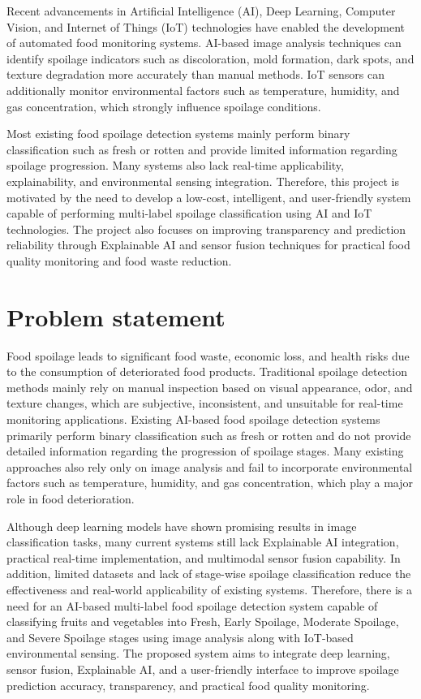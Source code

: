 Recent advancements in Artificial Intelligence (AI), Deep Learning, Computer Vision, and Internet of Things (IoT) technologies have enabled the development of automated food monitoring systems. AI-based image analysis techniques can identify spoilage indicators such as discoloration, mold formation, dark spots, and texture degradation more accurately than manual methods. IoT sensors can additionally monitor environmental factors such as temperature, humidity, and gas concentration, which strongly influence spoilage conditions.

Most existing food spoilage detection systems mainly perform binary classification such as fresh or rotten and provide limited information regarding spoilage progression. Many systems also lack real-time applicability, explainability, and environmental sensing integration. Therefore, this project is motivated by the need to develop a low-cost, intelligent, and user-friendly system capable of performing multi-label spoilage classification using AI and IoT technologies. The project also focuses on improving transparency and prediction reliability through Explainable AI and sensor fusion techniques for practical food quality monitoring and food waste reduction.

\section[Problem statement]{\textbf{Problem statement}}
Food spoilage leads to significant food waste, economic loss, and health risks due to the consumption of deteriorated food products. Traditional spoilage detection methods mainly rely on manual inspection based on visual appearance, odor, and texture changes, which are subjective, inconsistent, and unsuitable for real-time monitoring applications. Existing AI-based food spoilage detection systems primarily perform binary classification such as fresh or rotten and do not provide detailed information regarding the progression of spoilage stages. Many existing approaches also rely only on image analysis and fail to incorporate environmental factors such as temperature, humidity, and gas concentration, which play a major role in food deterioration.

Although deep learning models have shown promising results in image classification tasks, many current systems still lack Explainable AI integration, practical real-time implementation, and multimodal sensor fusion capability. In addition, limited datasets and lack of stage-wise spoilage classification reduce the effectiveness and real-world applicability of existing systems. Therefore, there is a need for an AI-based multi-label food spoilage detection system capable of classifying fruits and vegetables into Fresh, Early Spoilage, Moderate Spoilage, and Severe Spoilage stages using image analysis along with IoT-based environmental sensing. The proposed system aims to integrate deep learning, sensor fusion, Explainable AI, and a user-friendly interface to improve spoilage prediction accuracy, transparency, and practical food quality monitoring.

